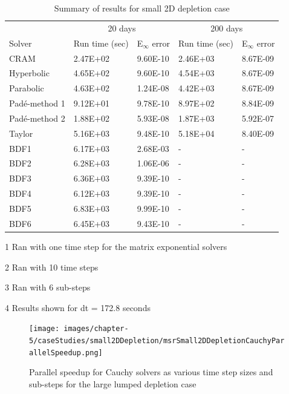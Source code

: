 \clearpage

\begin{table}[p]
\centering
\begin{threeparttable}
   \caption{\label{tab:small_2D_depletion_runtimes} Summary of results for small 2D depletion case}
   \begin{tabular}{lllll}
   \hline
   \multicolumn{1}{c}{} & \multicolumn{2}{c}{20 days\tnote{1}} & \multicolumn{2}{c}{200 days\tnote{2}} \\
   \cline{2-5} 
   Solver & Run time (sec) & E$_{\infty}$ error & Run time (sec) & E$_{\infty}$ error \\
   \hline
   CRAM\tnote{3} & 2.47E+02 & 9.60E-10 & 2.46E+03 & 8.67E-09 \\
   Hyperbolic\tnote{3} & 4.65E+02 & 9.60E-10 & 4.54E+03 & 8.67E-09 \\
   Parabolic\tnote{3} & 4.63E+02 & 1.24E-08 & 4.42E+03 & 8.67E-09 \\
   Pad\'e-method 1 & 9.12E+01 & 9.78E-10 & 8.97E+02 & 8.84E-09 \\
   Pad\'e-method 2 & 1.88E+02 & 5.93E-08 & 1.87E+03 & 5.92E-07 \\
   Taylor & 5.16E+03 & 9.48E-10 & 5.18E+04 & 8.40E-09 \\
   BDF1\tnote{4} & 6.17E+03 & 2.68E-03 & - & - \\
   BDF2\tnote{4} & 6.28E+03 & 1.06E-06 & - & - \\
   BDF3\tnote{4} & 6.36E+03 & 9.39E-10 & - & - \\
   BDF4\tnote{4} & 6.12E+03 & 9.39E-10 & - & - \\
   BDF5\tnote{4} & 6.83E+03 & 9.99E-10 & - & - \\
   BDF6\tnote{4} & 6.45E+03 & 9.43E-10 & - & - \\
   \hline
   \end{tabular}
	\begin{tablenotes}
      \small
      \item [1] Ran with one time step for the matrix exponential solvers
      \item [2] Ran with 10 time steps
      \item [3] Ran with 6 sub-steps
      \item [4] Results shown for dt = 172.8 seconds
    \end{tablenotes}
\end{threeparttable}
\end{table} 

\begin{figure}[p]
    \centering
    \texttt{[image: images/chapter-5/caseStudies/small2DDepletion/msrSmall2DDepletionCauchyParallelSpeedup.png]}
    \caption{Parallel speedup for Cauchy solvers as various time step sizes and sub-steps for the large lumped depletion case}
    \label{fig:small_2D_depletion_cauchy_speedup}
\end{figure}

